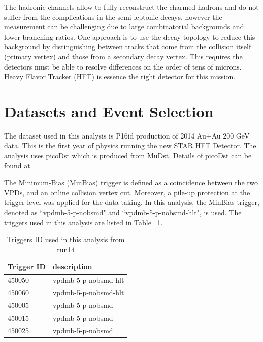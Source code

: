 \documentclass[a4paper]{article}
\begin{document}
The hadronic channels allow to fully reconstruct the charmed hadrons and do not suffer from the complications in the semi-leptonic decays, however the measurement can be challenging due to large combinatorial backgrounds and lower branching ratios. One approach is to use the decay topology to reduce this background by distinguishing between tracks that come from the collision itself (primary vertex) and those from a secondary decay vertex. This requires the detectors must be able to resolve differences on the order of tens of microns. Heavy Flavor Tracker (HFT) is essence the right detector for this mission.

\section{\label{dataset}Datasets and Event Selection}

The dataset used in this analysis is P16id production of 2014 Au+Au 200 GeV data. This is the first year of physics running the new STAR HFT Detector. The analysis uses picoDst which is produced from MuDst. Details of picoDst can be found at~\cite{picoWebpage}

The Minimum-Bias (MinBias) trigger is defined as a coincidence between the two VPDs, and an online collision vertex cut. Moreover, a pile-up protection at the trigger level was applied for the data taking. In this analysis, the MinBias trigger, denoted as ``vpdmb-5-p-nobsmd" and ``vpdmb-5-p-nobsmd-hlt", is used. The triggers used in this analysis are listed in Table ~\ref{trigger}.

\begin{table}[htp]
\centering
\caption{Triggers ID used in this analysis from run14}
\label{trigger}
	\begin{center}
	\begin{tabular}{l|l}
	Trigger ID	& description\\ \hline
	450050		& vpdmb-5-p-nobsmd-hlt\\ \hline
	450060		& vpdmb-5-p-nobsmd-hlt\\ \hline
	450005		& vpdmb-5-p-nobsmd\\ \hline
	450015		& vpdmb-5-p-nobsmd\\ \hline
	450025		& vpdmb-5-p-nobsmd\\ \hline
	\end{tabular}
	\end{center}
\end{table}
\end{document}
